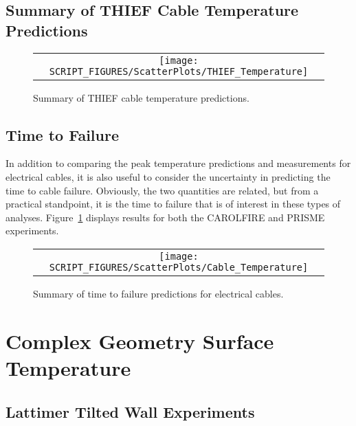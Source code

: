 \clearpage

\subsection{Summary of THIEF Cable Temperature Predictions}


\begin{figure}[h!]
\begin{center}
\begin{tabular}{c}
\texttt{[image: SCRIPT\_FIGURES/ScatterPlots/THIEF\_Temperature]}
\end{tabular}
\end{center}
\caption[Summary of THIEF cable temperature predictions]
{Summary of THIEF cable temperature predictions.}
\end{figure}

\clearpage

\subsection{Time to Failure}

In addition to comparing the peak temperature predictions and measurements for electrical cables, it is also useful to consider the uncertainty in predicting the time to cable failure. Obviously, the two quantities are related, but from a practical standpoint, it is the time to failure that is of interest in these types of analyses. Figure~\ref{Cable_Failure_Time_Summary_Plot} displays results for both the CAROLFIRE and PRISME experiments.

\begin{figure}[h!]
\begin{center}
\begin{tabular}{c}
\texttt{[image: SCRIPT\_FIGURES/ScatterPlots/Cable\_Temperature]}
\end{tabular}
\end{center}
\caption[Summary of time to failure predictions for electrical cables]
{Summary of time to failure predictions for electrical cables.}
\label{Cable_Failure_Time_Summary_Plot}
\end{figure}

\clearpage

\section{Complex Geometry Surface Temperature}


\subsection{Lattimer Tilted Wall Experiments}

